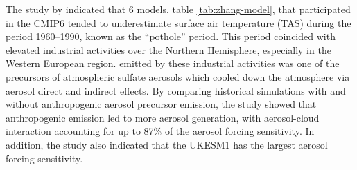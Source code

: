 The study by \citet{zhangRoleAnthropogenicAerosols2021} indicated that 6 models, table \ref{tab:zhang-model}, that participated in the CMIP6 tended to underestimate surface air temperature (TAS) during the period 1960--1990, known as the “pothole” period. This period coincided with elevated industrial activities over the Northern Hemisphere, especially in the Western European region.  emitted by these industrial activities was one of the precursors of atmospheric sulfate aerosols which cooled down the atmosphere via aerosol direct and indirect effects. By comparing historical simulations with and without anthropogenic aerosol precursor emission, the study showed that anthropogenic emission led to more aerosol generation, with aerosol-cloud interaction accounting for up to 87\% of the aerosol forcing sensitivity. In addition, the study also indicated that the UKESM1 has the largest aerosol forcing sensitivity. 


